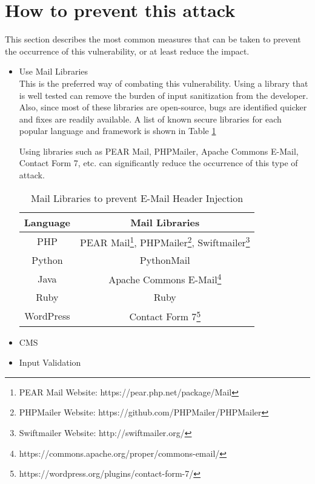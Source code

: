\section[Mitigation Strategy]{How to prevent this attack}
This section describes the most common measures that can be taken to prevent the occurrence of this vulnerability, or at least reduce the impact.
\begin{itemize}
	\item Use Mail Libraries\\
	This is the preferred way of combating this vulnerability. Using a library that is well tested can remove the burden of input sanitization from the developer. Also, since most of these libraries are open-source, bugs are identified quicker and fixes are readily available.
	A list of known secure libraries for each popular language and framework is shown in Table \ref{tab:maillib}
	
	Using libraries such as PEAR Mail, PHPMailer, Apache Commons E-Mail, Contact Form 7, etc. can significantly reduce the occurrence of this type of attack.
	
	\begin{table}[!htbp]
		\centering
		\begin{tabular}{|c|c|}
			\hline
			Language & Mail Libraries\\
			\hline
			PHP & {{PEAR Mail\footnote{PEAR Mail Website: https://pear.php.net/package/Mail}, PHPMailer\footnote{PHPMailer Website: https://github.com/PHPMailer/PHPMailer}, Swiftmailer\footnote{Swiftmailer Website: http://swiftmailer.org/}}}\\
			\hline
			Python & PythonMail\\
			\hline
			Java & Apache Commons E-Mail\footnote{https://commons.apache.org/proper/commons-email/}\\
			\hline
			Ruby & Ruby\\
			\hline
			WordPress & Contact Form 7\footnote{https://wordpress.org/plugins/contact-form-7/}\\
			\hline
		\end{tabular}
		\caption{Mail Libraries to prevent E-Mail Header Injection}
		\label{tab:maillib}
	\end{table}
	
	\item CMS
	\item Input Validation
\end{itemize}


